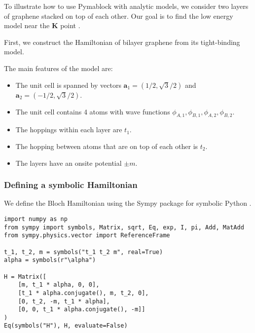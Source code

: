
To illustrate how to use Pymablock with analytic models, we consider two layers
of graphene stacked on top of each other.
Our goal is to find the low energy model near the $\mathbf{K}$ point
\cite{McCann_2013}.

First, we construct the Hamiltonian of bilayer graphene from its tight-binding
model.


The main features of the model are:

\begin{itemize}
\item The unit cell is spanned by vectors $\mathbf{a}_1 = (1/2, \sqrt{3}/2)$ and $\mathbf{a}_2=( -1/2, \sqrt{3}/2)$.
\item The unit cell contains 4 atoms with wave functions $\phi_{A,1}, \phi_{B,1}, \phi_{A,2}, \phi_{B,2}$.
\item The hoppings within each layer are $t_1$.
\item The hopping between atoms that are on top of each other is $t_2$.
\item The layers have an onsite potential $\pm m$.
\end{itemize}

\subsubsection{Defining a symbolic Hamiltonian}

We define the Bloch Hamiltonian using the Sympy package for symbolic Python
\cite{Meurer_2017}.

\begin{verbatim}
import numpy as np
from sympy import symbols, Matrix, sqrt, Eq, exp, I, pi, Add, MatAdd
from sympy.physics.vector import ReferenceFrame

t_1, t_2, m = symbols("t_1 t_2 m", real=True)
alpha = symbols(r"\alpha")

H = Matrix([
    [m, t_1 * alpha, 0, 0],
    [t_1 * alpha.conjugate(), m, t_2, 0],
    [0, t_2, -m, t_1 * alpha],
    [0, 0, t_1 * alpha.conjugate(), -m]]
)
Eq(symbols("H"), H, evaluate=False)
\end{verbatim}

